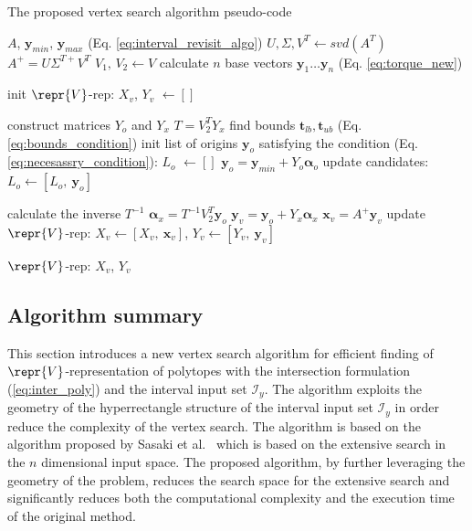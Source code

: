 \begin{algorithm}[!h]
\caption{The proposed vertex search algorithm pseudo-code}
\begin{algorithmic}
\REQUIRE $A$, $\bm{y}_{min}$, $\bm{y}_{max}$ (Eq. \ref{eq:interval_revisit_algo}) 
\STATE $U, \Sigma, V^T \leftarrow svd(A^T)$ 
\STATE $A^{+} = U\Sigma^{T+}V^T$
\STATE $V_1,\, V_2  \leftarrow V $
\STATE calculate $n$ base vectors $\bm{y}_1 \dotsc \bm{y}_n$ (Eq. \ref{eq:torque_new})

\STATE init $\repr{V}$-rep: $X_v$, $Y_v$ $\!\leftarrow\! []$

\STATE construct matrices $Y_o$ and $Y_x$
\STATE $T = V_2^TY_x$
\STATE find bounds $\bm{t}_{lb},\bm{t}_{ub}$ (Eq. \ref{eq:bounds_condition})
\STATE init list of origins $\bm{y}_o$ satisfying the condition (Eq. \ref{eq:necesassry_condition}): $L_o$ $\!\leftarrow\! []$ 
\STATE $\bm{y}_o = \bm{y}_{min} +  Y_o\bm{\alpha}_o$ 
\STATE update candidates: $L_o \!\leftarrow\! [L_o,~ \bm{y}_o]$
\ENDIF
\ENDFOR

\STATE calculate the inverse $T^{-1}$
\STATE $\bm{\alpha}_x = T^{-1}V_2^T\bm{y}_o $
\STATE $\bm{y}_{v} = \bm{y}_o + Y_x\bm{\alpha}_x$ 
\STATE $\bm{x}_{v} = A^{+}\bm{y}_{v}$ 
\STATE update $\repr{V}$-rep: ${X}_{v} \!\leftarrow\! [{X}_{v},~ \bm{x}_v ]$, ${Y}_{v} \!\leftarrow\! [{Y}_{v},~ \bm{y}_v ]$ 
\ENDIF
\ENDFOR
\ENDIF


\ENDIF

\ENDFOR
\RETURN $\repr{V}$-rep: $X_v$, $Y_v$

\end{algorithmic}
\label{alg:algo_1}
\end{algorithm}

\subsection{Algorithm summary}
This section introduces a new vertex search algorithm for efficient finding of $\repr{V}$-representation of polytopes with the intersection formulation (\ref{eq:inter_poly}) and the interval input set $\mathcal{I}_y$. The algorithm exploits the geometry of the hyperrectangle structure of the interval input set $\mathcal{I}_y$ in order reduce the complexity of the vertex search. The algorithm is based on the algorithm proposed by Sasaki et al.~\cite{sasaki2011vertex} which is based on the extensive search in the $n$ dimensional input space. The proposed algorithm, by further leveraging the geometry of the problem, reduces the search space for the extensive search and significantly reduces both the computational complexity and the execution time of the original method.

